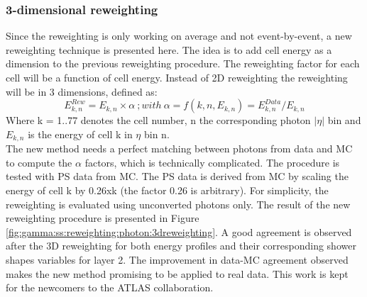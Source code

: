 \subsubsection{3-dimensional reweighting}
Since the reweighting is only working on average and not event-by-event, a new reweighting technique is presented here. The idea is to add cell energy as a dimension to the previous reweighting procedure. The reweighting factor for each cell will be a function of cell energy. Instead of 2D reweighting the reweighting will be in 3 dimensions, defined as:
\begin{equation}
    E_{k,n}^{Rew} = E_{k,n} \times \alpha \ ; with \ \alpha = f(k,n,E_{k,n}) = E_{k,n}^{Data}/E_{k,n}
\end{equation}
Where k = 1..77 denotes the cell number, n the corresponding photon $|\eta|$ bin and $E_{k,n}$ is the energy of cell k in $\eta$ bin n. \\
The new method needs a perfect matching between photons from data and MC to compute the $\alpha$ factors, which is technically complicated. The procedure is tested with PS data from MC. The PS data is derived from MC by scaling the energy of cell k by 0.26xk (the factor 0.26 is arbitrary). For simplicity, the reweighting is evaluated using unconverted photons only.
The result of the new reweighting procedure is presented in Figure \ref{fig:gamma:ss:reweighting:photon:3dreweighting}. A good agreement is observed after the 3D reweighting for both energy profiles and their corresponding shower shapes variables for layer 2. The improvement in data-MC agreement observed makes the new method promising to be applied to real data. This work is kept for the newcomers to the ATLAS collaboration.

